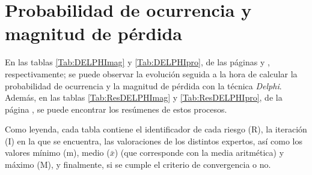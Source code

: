 \documentclass[11pt,a4paper,spanish,twoside]{book}
\begin{document}
\chapter{Probabilidad de ocurrencia y magnitud de pérdida} 
En las tablas \ref{Tab:DELPHImag} y \ref{Tab:DELPHIpro}, de las páginas
\pageref{Tab:DELPHImag} y \pageref{Tab:DELPHIpro}, respectivamente; se  
puede observar la evolución seguida a la hora de calcular la probabilidad de
ocurrencia y la magnitud de pérdida con la técnica \emph{Delphi}. Además, en
las tablas \ref{Tab:ResDELPHImag} y \ref{Tab:ResDELPHIpro}, de la página
\pageref{Tab:ResDELPHIpro}, se puede encontrar los resúmenes de estos procesos.

Como leyenda, cada tabla contiene el identificador de cada riesgo (R), la
iteración (I) en la que se encuentra, las valoraciones de los distintos
expertos, así como los valores mínimo (m), medio ($\bar{x}$) (que corresponde
con la media aritmética) y máximo (M), y finalmente, si se cumple el criterio
de convergencia o no.
\end{document}
